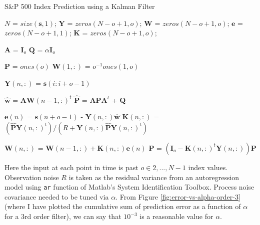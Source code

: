 \documentclass[11pt, fleqn]{article}
\begin{document}
\begin{algorithm}[H]
\caption{S\&P 500 Index Prediction using a Kalman Filter}
\label{alg:kalman}
\begin{algorithmic}


\State {}

\State $N$ = $size(\bm{s}, 1)$; 
\State $\bm{Y}$ = $zeros(N - o + 1, o)$; 
\State $\bm{W}$ = $zeros(N - o + 1, o)$; 
\State $\bm{e}$ = $zeros(N - o + 1, 1)$; 
\State $\bm{K}$ = $zeros(N - o + 1, o)$; 

\State

\State $\bm{A}$ = $\bm{I}_o$ 
\State $\bm{Q}$ = $\alpha\bm{I}_o$ 

\State

\State $\bm{P}$ = $ones(o)$ 
\State $\bm{W}(1,:)$ = $o^{-1}ones(1,o)$

\State


	\State $\bm{Y}(n, :)$ = $\bm{s}(i:i+o-1)$ 

	\State

	\State $\hat{\bm{w}}$ = $\bm{A}\bm{W}(n-1, :)^t$ 
	\State $\hat{\bm{P}}$ = $\bm{A}\bm{P}\bm{A}^t$ + $\bm{Q}$ 

	\State
	
	\State $\bm{e}(n)$ = $\bm{s}(n+o-1)$ - $\bm{Y}(n, :)\hat{\bm{w}}$ 
	\State $\bm{K}(n,:)$ = $(\hat{\bm{P}}\bm{Y}(n, :)^t)/(R + \bm{Y}(n, :)\hat{\bm{P}}\bm{Y}(n, :)^t)$ 

	\State

	\State $\bm{W}(n, :)$ = $\bm{W}(n-1, :) + \bm{K}(n,:)\bm{e}(n)$ 
	\State $\bm{P}$ = $(\bm{I}_o - \bm{K}(n,:)^t\bm{Y}(n, :))\bm{P}$ 

\EndFor

\EndProcedure
\end{algorithmic}
\end{algorithm}

Here the input at each point in time is past $o \in {2, ..., N-1}$ index values. Observation noise $R$ is taken as the residual variance from an autoregression model using \texttt{ar} function of Matlab's System Identification Toolbox. Process noise covariance needed to be tuned via $\alpha$. From Figure \ref{fig:error-vs-alpha-order-3} (where I have plotted the cumulative sum of prediction error as a function of $\alpha$ for a 3rd order filter), we can say that $10^{-3}$ is a reasonable value for $\alpha$.\\
\end{document}
